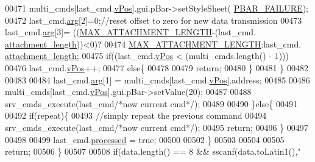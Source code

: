 \begin{DoxyCode}
{{{{{{{{{{{{{{{{00471                      multi\_cmds[last\_cmd.\hyperlink{a00001_a2b48b371fd84be2a8ad581b1ad708b88}{vPos}].gui.pBar->setStyleSheet(
      \hyperlink{a00034_aa9f43b2774395af6510910f8feed7cb4}{PBAR\_FAILURE});
00472                      last\_cmd.\hyperlink{a00001_a56e6c2d7315d0ae60a51e8b140c9cfe4}{arg}[2]=0;\textcolor{comment}{//reset offset to zero for new data transmission}
00473                      last\_cmd.\hyperlink{a00001_a56e6c2d7315d0ae60a51e8b140c9cfe4}{arg}[3]= ((\hyperlink{a00031_aa8abe3a822c64813f7aaba3ca7e3db9c}{MAX\_ATTACHMENT\_LENGTH}-(last\_cmd.
      \hyperlink{a00001_ae5afad7c81dab7d9ab6587251aafdbf4}{attachment\_length}))<0)?
00474                                           \hyperlink{a00031_aa8abe3a822c64813f7aaba3ca7e3db9c}{MAX\_ATTACHMENT\_LENGTH}:last\_cmd.
      \hyperlink{a00001_ae5afad7c81dab7d9ab6587251aafdbf4}{attachment\_length};
00475                      \textcolor{keywordflow}{if}((last\_cmd.\hyperlink{a00001_a2b48b371fd84be2a8ad581b1ad708b88}{vPos} < (multi\_cmds.length() - 1)))
00476                          last\_cmd.\hyperlink{a00001_a2b48b371fd84be2a8ad581b1ad708b88}{vPos}++;
00477                      \textcolor{keywordflow}{else}\{
00478 
00479                          \textcolor{keywordflow}{return};
00480                       \}
00481                      \}
00482 
00483 
00484                      last\_cmd.\hyperlink{a00001_a56e6c2d7315d0ae60a51e8b140c9cfe4}{arg}[1] = multi\_cmds[last\_cmd.\hyperlink{a00001_a2b48b371fd84be2a8ad581b1ad708b88}{vPos}].address;
00485 
00486                      multi\_cmds[last\_cmd.\hyperlink{a00001_a2b48b371fd84be2a8ad581b1ad708b88}{vPos}].gui.pBar->setValue(20);
00487 
00488                      srv\_cmds\_execute(last\_cmd\textcolor{comment}{/*now current cmd*/});
00489 
00490                  \}\textcolor{keywordflow}{else}\{
00491 
00492                      \textcolor{keywordflow}{if}(repeat)\{
00493                         \textcolor{comment}{//simply repeat the previous command}
00494                         srv\_cmds\_execute(last\_cmd\textcolor{comment}{/*now current cmd*/});
00495                         \textcolor{keywordflow}{return};
00496                      \}
00497 
00498 
00499                      last\_cmd.\hyperlink{a00001_a3e88f779da9798a5da7dda227e2ca388}{processed} = \textcolor{keyword}{true};
00500 
00502                  \}
00503 
00504 
00505             \textcolor{keywordflow}{return};
00506          \}
00507 
00508         \textcolor{keywordflow}{if}(data.length() == 8 && sscanf(data.toLatin1(),\textcolor{stringliteral}{"%
}}}}}}}}}}}}}}}}}
\end{DoxyCode}
